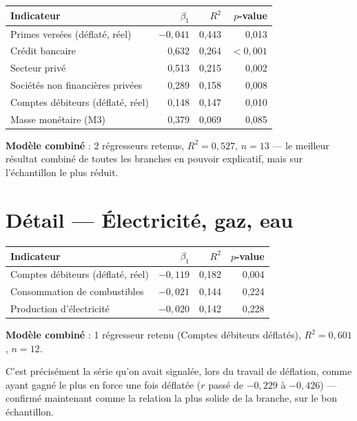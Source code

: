 \documentclass[11pt,a4paper]{article}
\begin{document}
\begin{center}
\small
\begin{tabular}{lrrr}
\toprule
\textbf{Indicateur} & \textbf{$\beta_1$} & \textbf{$R^2$} & \textbf{$p$-value} \\
\midrule
Primes versées (déflaté, réel) & $-0{,}041$ & 0,443 & 0,013 \\
Crédit bancaire & 0,632 & 0,264 & $<0{,}001$ \\
Secteur privé & 0,513 & 0,215 & 0,002 \\
Sociétés non financières privées & 0,289 & 0,158 & 0,008 \\
Comptes débiteurs (déflaté, réel) & 0,148 & 0,147 & 0,010 \\
Masse monétaire (M3) & 0,379 & 0,069 & 0,085 \\
\bottomrule
\end{tabular}
\end{center}

\textbf{Modèle combiné} : 2 régresseurs retenus, $R^2=0{,}527$, $n=13$ --- le meilleur résultat combiné de toutes les branches en pouvoir explicatif, mais sur l'échantillon le plus réduit.

\section{Détail --- Électricité, gaz, eau}

\begin{center}
\small
\begin{tabular}{lrrr}
\toprule
\textbf{Indicateur} & \textbf{$\beta_1$} & \textbf{$R^2$} & \textbf{$p$-value} \\
\midrule
Comptes débiteurs (déflaté, réel) & $-0{,}119$ & 0,182 & 0,004 \\
Consommation de combustibles & $-0{,}021$ & 0,144 & 0,224 \\
Production d'électricité & $-0{,}020$ & 0,142 & 0,228 \\
\bottomrule
\end{tabular}
\end{center}

\textbf{Modèle combiné} : 1 régresseur retenu (Comptes débiteurs déflatés), $R^2=0{,}601$, $n=12$.

\begin{intuition}
C'est précisément la série qu'on avait signalée, lors du travail de déflation, comme ayant gagné le plus en force une fois déflatée ($r$ passé de $-0{,}229$ à $-0{,}426$) --- confirmé maintenant comme la relation la plus solide de la branche, sur le bon échantillon.
\end{intuition}
\end{document}
